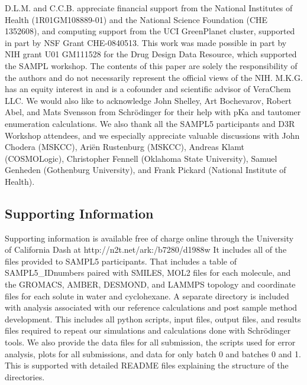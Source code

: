 \begin{acknowledgements} 
D.L.M. and C.C.B. appreciate financial support from the National Institutes of Health (1R01GM108889-01) and the National Science Foundation (CHE 1352608), and computing support from the UCI GreenPlanet cluster, supported in part by NSF Grant CHE-0840513. 
This work was made possible in part by NIH grant U01 GM111528 for the Drug Design Data Resource, which supported the SAMPL workshop. 
The contents of this paper are solely the responsibility of the authors and do not necessarily represent the official views of the NIH.
M.K.G. has an equity interest in and is a cofounder and scientific advisor of VeraChem LLC. 
We would also like to acknowledge John Shelley, Art Bochevarov, Robert Abel, and Mats Svensson from Schr\"{o}dinger for their help with pKa and tautomer enumeration calculations. %
We also thank all the SAMPL5 participants and D3R Workshop attendees, and we especially appreciate valuable discussions with John Chodera (MSKCC), Ari\"{e}n Rustenburg (MSKCC), Andreas Klamt (COSMOLogic), Christopher Fennell (Oklahoma State University), Samuel Genheden (Gothenburg University), and Frank Pickard (National Institute of Health). 
\end{acknowledgements}

\subsection{Supporting Information}
Supporting information is available free of charge online through the University of California Dash at http://n2t.net/ark:/b7280/d1988w
It includes all of the files provided to SAMPL5 participants. That includes a table of SAMPL5\_IDnumbers paired with SMILES,  MOL2 files for each molecule, and the GROMACS, AMBER, DESMOND, and LAMMPS topology and coordinate files for each solute in water and cyclohexane. 
A separate directory is included with analysis associated with our reference calculations and post sample method development. 
This includes all python scripts, input files, output files, and results files required to repeat our simulations and calculations done with Schr\"{o}dinger tools. 
We also provide the data files for all submission, the scripts used for error analysis, plots for all submissions, and data for only batch 0 and batches 0 and 1.
This is supported with detailed README files explaining the structure of the directories. 
 


